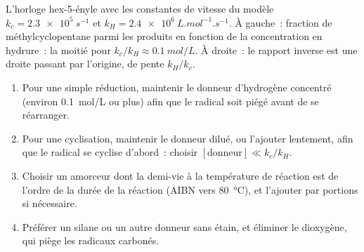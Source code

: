 \begin{omfigure}

{\small L'horloge hex-5-ényle avec les constantes de vitesse du modèle $k_c = \qty{2.3e5}{s^{-1}}$ et
$k_H = \qty{2.4e6}{L.mol^{-1}.s^{-1}}$. À gauche~: fraction de méthylcyclopentane parmi les produits en fonction de la
concentration en hydrure~: la moitié pour $k_c/k_H \approx \qty{0.1}{mol/L}$. À droite~: le rapport inverse est une droite
passant par l'origine, de pente $k_H/k_c$.}
\end{omfigure}

\begin{method}\label{met:b3:radicals-carbenes:radical-chain}
\begin{enumerate}
  \item Pour une simple réduction, maintenir le donneur d'hydrogène
        concentré (environ \qty{0.1}{mol/L} ou plus) afin que le radical soit piégé avant de se réarranger.
  \item Pour une cyclisation, maintenir le donneur dilué, ou l'ajouter
        lentement, afin que le radical se cyclise d'abord~: choisir $[\text{donneur}] \ll k_c/k_H$.
  \item Choisir un amorceur dont la demi-vie à la température de réaction
        est de l'ordre de la durée de la réaction (AIBN vers \qty{80}{\celsius}), et l'ajouter par portions si
        nécessaire.
  \item Préférer un silane ou un autre donneur sans étain, et éliminer le
        dioxygène, qui piège les radicaux carbonés.
\end{enumerate}
\end{method}

